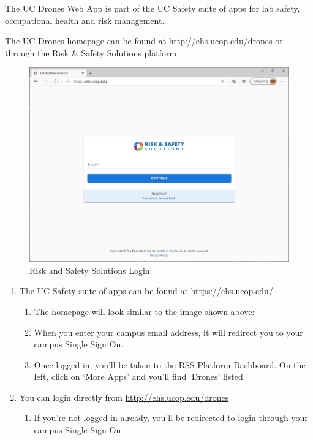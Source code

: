 \documentclass[
  12pt,
]{book}
\providecommand{\tightlist}{%
  \setlength{\itemsep}{0pt}\setlength{\parskip}{0pt}}
\begin{document}
The UC Drones Web App is part of the UC Safety suite of apps for lab safety, occupational health and risk management.

The UC Drones homepage can be found at \url{http://ehs.ucop.edu/drones} or through the Risk \& Safety Solutions platform

\begin{figure}

{\centering \includegraphics[width=0.85\linewidth]{images/RSS_home} 

}

\caption{Risk and Safety Solutions Login}\label{fig:rss-web}
\end{figure}

\begin{enumerate}
\def\labelenumi{\arabic{enumi}.}
\tightlist
\item
  The UC Safety suite of apps can be found at \url{https://ehs.ucop.edu/}

  \begin{enumerate}
  \def\labelenumii{\arabic{enumii}.}
  \tightlist
  \item
    The homepage will look similar to the image shown above:
  \item
    When you enter your campus email address, it will redirect you to your campus Single Sign On.
  \item
    Once logged in, you'll be taken to the RSS Platform Dashboard. On the left, click on `More Apps' and you'll find `Drones' listed
  \end{enumerate}
\item
  You can login directly from \url{http://ehs.ucop.edu/drones}

  \begin{enumerate}
  \def\labelenumii{\arabic{enumii}.}
  \tightlist
  \item
    If you're not logged in already, you'll be redirected to login through your campus Single Sign On
  \end{enumerate}
\end{enumerate}
\end{document}
